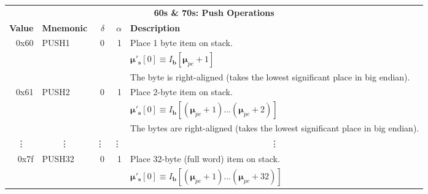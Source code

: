\documentclass[9pt,oneside]{amsart}
\begin{document}
\begin{tabular*}{\columnwidth}[h]{rlrrl}
\toprule
\multicolumn{5}{c}{\textbf{60s \& 70s: Push Operations}} \vspace{5pt} \\
\textbf{Value} & \textbf{Mnemonic} & $\delta$ & $\alpha$ & \textbf{Description} \vspace{5pt} \\
0x60 & {\small PUSH1} & 0 & 1 & Place 1 byte item on stack. \\
&&&& $\boldsymbol{\mu}'_\mathbf{s}[0] \equiv I_\mathbf{b}[\boldsymbol{\mu}_{pc} + 1]$ \\
&&&& The byte is right-aligned (takes the lowest significant place in big endian). \\
\midrule
0x61 & {\small PUSH2} & 0 & 1 & Place 2-byte item on stack. \\
&&&& $\boldsymbol{\mu}'_\mathbf{s}[0] \equiv I_\mathbf{b}[(\boldsymbol{\mu}_{pc} + 1) \dots (\boldsymbol{\mu}_{pc} + 2) ]$ \\
&&&& The bytes are right-aligned (takes the lowest significant place in big endian). \\
\midrule
\multicolumn{1}{c}{\vdots} & \multicolumn{1}{c}{\vdots} & \vdots & \vdots & \multicolumn{1}{c}{\vdots} \\
\midrule
0x7f & {\small PUSH32} & 0 & 1 & Place 32-byte (full word) item on stack. \\
&&&& $\boldsymbol{\mu}'_\mathbf{s}[0] \equiv I_\mathbf{b}[(\boldsymbol{\mu}_{pc} + 1) \dots (\boldsymbol{\mu}_{pc} + 32) ]$ \\
\bottomrule
\end{tabular*}
\end{document}
